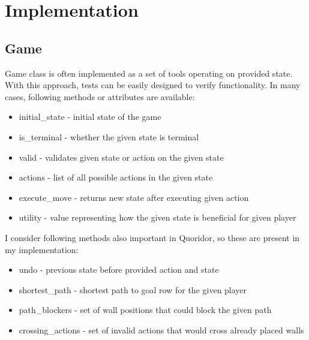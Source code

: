 \chapter{Implementation}\label{chap:4}

\section{Game}
Game class is often implemented as a set of tools operating on provided state.
With this approach, tests can be easily designed to verify functionality.
In many cases, following methods or attributes are available:
\begin{itemize}
  \vspace*{-0.25cm}
  \setlength\itemsep{-0.15cm}

  \item initial\_state - initial state of the game
  \item is\_terminal - whether the given state is terminal
  \item valid - validates given state or action on the given state
  \item actions - list of all possible actions in the given state
  \item execute\_move - returns new state after executing given action
  \item utility - value representing how the given state is beneficial
                  for given player

  \vspace*{-0.25cm}
\end{itemize}

\noindent I consider following methods also important in Quoridor, so these are
present in my implementation:
\begin{itemize}
  \vspace*{-0.25cm}
  \setlength\itemsep{-0.15cm}

  \item undo - previous state before provided action and state
  \item shortest\_path - shortest path to goal row for the given player
  \item path\_blockers - set of wall positions that could block the given path
  \item crossing\_actions - set of invalid actions that would cross already
                            placed walls

  \vspace*{-0.25cm}
\end{itemize}

